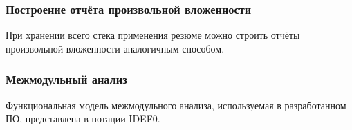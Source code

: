 \documentclass[hyperref={pdfpagelabels=false},10pt]{beamer}
\begin{document}
\begin{frame}
\frametitle{Построение отчёта произвольной вложенности}
При хранении всего стека применения резюме можно строить отчёты произвольной вложенности аналогичным способом.
\begin{figure}[h]
\end{figure}
\end{frame}



\begin{frame}
\frametitle{Межмодульный анализ}
Функциональная модель межмодульного анализа, используемая в разработанном ПО, представлена в нотации IDEF0.
\begin{figure}[h]
\end{figure}
\end{frame}
\end{document}
